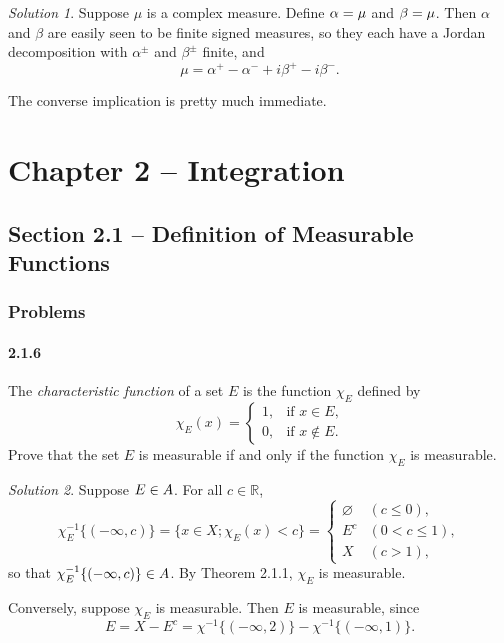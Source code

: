 \documentclass{report}
\let\Re\relax
\DeclareMathOperator{\Re}{\mathrm{Re}}
\let\Im\relax
\DeclareMathOperator{\Im}{\mathrm{Im}}
\newcommand{\bb}[1]{\mathbb{#1}}
\let\cal\relax
\newcommand{\cal}[1]{\mathcal{#1}}
\theoremstyle{remark}
\newtheorem*{solution}{Solution}
\begin{document}
\begin{solution}
  Suppose $\mu$ is a complex measure. Define $\alpha = \Re \mu$ and $\beta = \Im \mu$. Then $\alpha$ and $\beta$ are easily seen to be finite signed measures, so they each have a Jordan decomposition with $\alpha^\pm$ and $\beta^\pm$ finite, and
  \begin{equation*}
    \mu = \alpha^+ - \alpha^- + i \beta^+ - i \beta^-.
  \end{equation*}

  The converse implication is pretty much immediate.
\end{solution}

\chapter*{Chapter 2 -- Integration}

\section*{Section 2.1 -- Definition of Measurable Functions}

\subsection*{Problems}

\subsubsection*{2.1.6}
The \emph{characteristic function} of a set $E$ is the function $\chi_E$ defined by
\begin{equation*}
  \chi_E(x) =
  \begin{cases}
    1, & \text{if $x \in E$,} \\
    0, & \text{if $x \notin E$.}
  \end{cases}
\end{equation*}
Prove that the set $E$ is measurable if and only if the function $\chi_E$ is measurable.

\begin{solution}
  Suppose $E \in \cal A$. For all $c \in \bb R$,
  \begin{equation*}
    \chi_E^{-1}\{(-\infty, c)\} = \{x \in X; \chi_E(x) < c\} =
    \begin{cases}
      \varnothing & (c \le 0), \\
      E^c & (0 < c \le 1), \\
      X & (c > 1),
    \end{cases}
  \end{equation*}
  so that $\chi_E^{-1}\{(-\infty, c)\} \in \cal A$. By Theorem 2.1.1, $\chi_E$ is measurable.

  Conversely, suppose $\chi_E$ is measurable. Then $E$ is measurable, since
  \begin{equation*}
    E = X - E^c = \chi^{-1}\{(-\infty, 2)\} - \chi^{-1}\{(-\infty, 1)\}.
  \end{equation*}
\end{solution}
\end{document}
